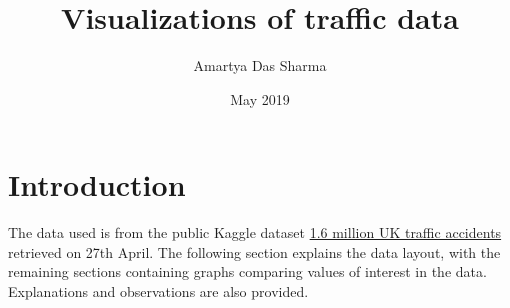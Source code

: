 \documentclass[a4paper, 12pt]{article}
\begin{document}
\title{Visualizations of traffic data}

\author{Amartya Das Sharma}
\date{May 2019}
\maketitle

\section{Introduction}
The data used is from the public Kaggle dataset \href{https://www.kaggle.com/daveianhickey/2000-16-traffic-flow-england-scotland-wales/version/10}{1.6 million UK traffic accidents} retrieved on 27th April. The following section explains the data layout, with the remaining sections containing graphs comparing values of interest in the data. Explanations and observations are also provided.
\end{document}
